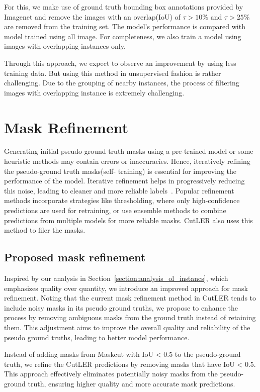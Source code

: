 For this, we make use of ground truth bounding box annotations provided by Imagenet and remove the images with an overlap(IoU) of \(\tau > \text{10\%}\text{ and }\tau > \text{25\%}\) are removed from the training set. The model's performance is compared with model trained using all image. For completeness, we also train a model using images with overlapping instances only.

Through this approach, we expect to observe an improvement by using less training data. But using this method in unsupervised fashion is rather challenging. Due to the grouping of nearby instances, the process of filtering images with overlapping instance is extremely challenging.

\section{Mask Refinement}
Generating initial pseudo-ground truth masks using a pre-trained model or some heuristic methods may contain errors or inaccuracies. Hence, iteratively refining the pseudo-ground truth masks(self- training) is essential for improving the performance of the model. Iterative refinement helps in progressively reducing this noise, leading to cleaner and more reliable labels~\cite{xie2020selftrainingnoisystudentimproves}. Popular refinement methods incorporate strategies like thresholding, where only high-confidence predictions are used for retraining, or use ensemble methods to combine predictions from multiple models for more reliable masks. CutLER also uses this method to filer the masks.

\subsection{Proposed mask refinement}
Inspired by our analysis in Section~\ref{section:analysis_ol_instancs}, which emphasizes quality over quantity, we introduce an improved approach for mask refinement. Noting that the current mask refinement method in CutLER tends to include noisy masks in its pseudo ground truths, we propose to enhance the process by removing ambiguous masks from the ground truth instead of retaining them. This adjustment aims to improve the overall quality and reliability of the pseudo ground truths, leading to better model performance.

Instead of adding masks from Maskcut with IoU < 0.5 to the pseudo-ground truth, we refine the CutLER predictions by removing masks that have IoU < 0.5. This approach effectively eliminates potentially noisy masks from the pseudo-ground truth, ensuring higher quality and more accurate mask predictions.

